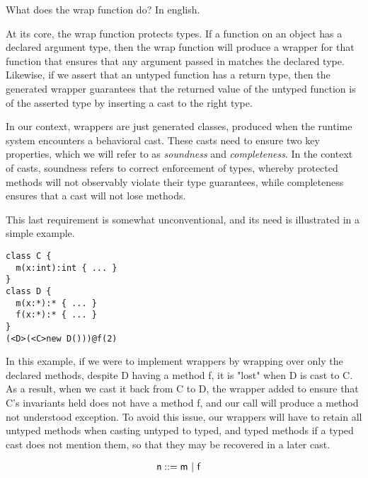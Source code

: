 \documentclass[a4paper,UKenglish,final]{tex/lipics-v2016}
\begin{document}
What does the wrap function do? In english.

At its core, the wrap function protects types. If a function on an object has a declared argument type, then the wrap function will produce a wrapper for that function that ensures that any argument passed in matches the declared type. Likewise, if we assert that an untyped function has a return type, then the generated wrapper guarantees that the returned value of the untyped function is of the asserted type by inserting a cast to the right type.

In our context, wrappers are just generated classes, produced when the runtime system encounters a behavioral cast. These casts need to ensure two key properties, which we will refer to as \emph{soundness} and \emph{completeness}. In the context of casts, soundness refers to correct enforcement of types, whereby protected methods will not observably violate their type guarantees, while completeness ensures that a cast will not lose methods.

This last requirement is somewhat unconventional, and its need is illustrated in a simple example. 

\begin{verbatim}
class C {
  m(x:int):int { ... }
}
class D {
  m(x:*):* { ... }
  f(x:*):* { ... }
}
(<D>(<C>new D()))@f(2)
\end{verbatim}

In this example, if we were to implement wrappers by wrapping over only the declared methods, despite D having a method f, it is "lost" when D is cast to C. As a result, when we cast it back from C to D, the wrapper added to ensure that C's invariants held does not have a method f, and our call will produce a method not understood exception. To avoid this issue, our wrappers will have to retain all untyped methods when casting untyped to typed, and typed methods if a typed cast does not mention them, so that they may be recovered in a later cast.

\hrulefill

\newcommand{\tfa}{\text{\emph{for every }}}
\newcommand{\wh}{\text{\emph{where}}}
\newcommand{\wc}{\text{wrapClass}}

\begin{align*}
{\sf{n}} &::= {\sf{m}} ~|~ {\sf{f}}
\end{align*}
\end{document}
